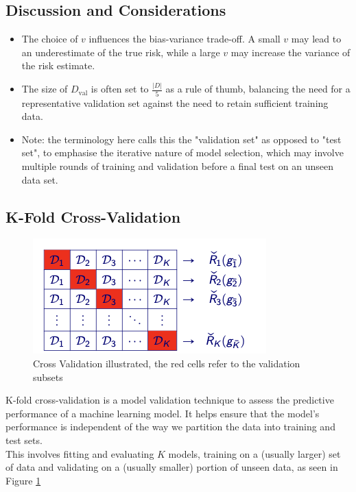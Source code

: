 \subsection*{Discussion and Considerations}

\begin{itemize}
  \item The choice of \( v \) influences the bias-variance trade-off. A small \( v \) may lead to an underestimate of the true risk, while a large \( v \) may increase the variance of the risk estimate.
  \item The size of \( D_{\text{val}} \) is often set to \( \frac{|D|}{5} \) as a rule of thumb, balancing the need for a representative validation set against the need to retain sufficient training data.
  \item Note: the terminology here calls this the "validation set" as opposed to "test set", to emphasise the iterative nature of model selection, which may involve multiple rounds of training and validation before a final test on an unseen data set.
\end{itemize}

\subsection{K-Fold Cross-Validation}
\begin{figure}[H]
    \centering
    \includegraphics[width=0.5\linewidth]{img/crossv.png}
    \caption{Cross Validation illustrated, the red cells refer to the validation subsets}
    \label{fig:crossv}
    
\end{figure}
K-fold cross-validation is a model validation technique to assess the predictive performance of a machine learning model. It helps ensure that the model's performance is independent of the way we partition the data into training and test sets.\\

This involves fitting and evaluating $K$ models, training on a (usually larger) set of data and validating on a (usually smaller) portion of unseen data, as seen in Figure \ref{fig:crossv}

